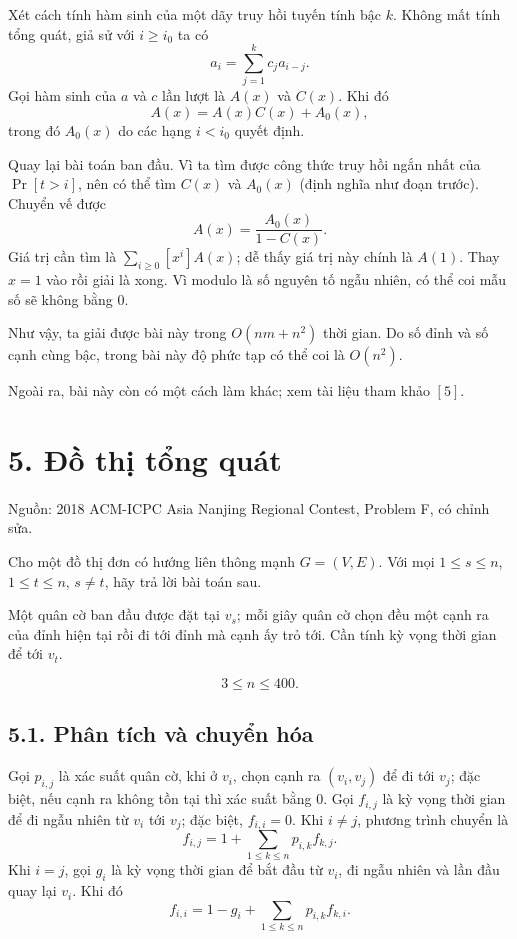 \documentclass[11pt]{article}
\begin{document}
Xét cách tính hàm sinh của một dãy truy hồi tuyến tính bậc \(k\). Không mất
tính tổng quát, giả sử với \(i\ge i_0\) ta có
\[
  a_i=\sum_{j=1}^{k}c_j a_{i-j}.
\]
Gọi hàm sinh của \(a\) và \(c\) lần lượt là \(A(x)\) và \(C(x)\). Khi đó
\[
  A(x)=A(x)C(x)+A_0(x),
\]
trong đó \(A_0(x)\) do các hạng \(i<i_0\) quyết định.

Quay lại bài toán ban đầu. Vì ta tìm được công thức truy hồi ngắn nhất của
\(\Pr[t>i]\), nên có thể tìm \(C(x)\) và \(A_0(x)\) (định nghĩa như đoạn
trước). Chuyển vế được
\[
  A(x)=\frac{A_0(x)}{1-C(x)}.
\]
Giá trị cần tìm là \(\sum_{i\ge0}[x^i]A(x)\); dễ thấy giá trị này chính là
\(A(1)\). Thay \(x=1\) vào rồi giải là xong. Vì modulo là số nguyên tố ngẫu
nhiên, có thể coi mẫu số sẽ không bằng \(0\).

Như vậy, ta giải được bài này trong \(O(nm+n^2)\) thời gian. Do số đỉnh và số
cạnh cùng bậc, trong bài này độ phức tạp có thể coi là \(O(n^2)\).

Ngoài ra, bài này còn có một cách làm khác; xem tài liệu tham khảo \([5]\).

\section*{5. Đồ thị tổng quát}

\paragraph{}
Nguồn: 2018 ACM-ICPC Asia Nanjing Regional Contest, Problem F, có chỉnh sửa.

Cho một đồ thị đơn có hướng liên thông mạnh \(G=(V,E)\). Với mọi
\(1\le s\le n\), \(1\le t\le n\), \(s\ne t\), hãy trả lời bài toán sau.

Một quân cờ ban đầu được đặt tại \(v_s\); mỗi giây quân cờ chọn đều một cạnh
ra của đỉnh hiện tại rồi đi tới đỉnh mà cạnh ấy trỏ tới. Cần tính kỳ vọng thời
gian để tới \(v_t\).

\[
  3\le n\le400.
\]

\subsection*{5.1. Phân tích và chuyển hóa}

Gọi \(p_{i,j}\) là xác suất quân cờ, khi ở \(v_i\), chọn cạnh ra \((v_i,v_j)\)
để đi tới \(v_j\); đặc biệt, nếu cạnh ra không tồn tại thì xác suất bằng
\(0\). Gọi \(f_{i,j}\) là kỳ vọng thời gian để đi ngẫu nhiên từ \(v_i\) tới
\(v_j\); đặc biệt, \(f_{i,i}=0\). Khi \(i\ne j\), phương trình chuyển là
\[
  f_{i,j}=1+\sum_{1\le k\le n}p_{i,k}f_{k,j}.
\]
Khi \(i=j\), gọi \(g_i\) là kỳ vọng thời gian để bắt đầu từ \(v_i\), đi ngẫu
nhiên và lần đầu quay lại \(v_i\). Khi đó
\[
  f_{i,i}=1-g_i+\sum_{1\le k\le n}p_{i,k}f_{k,i}.
\]
\end{document}
